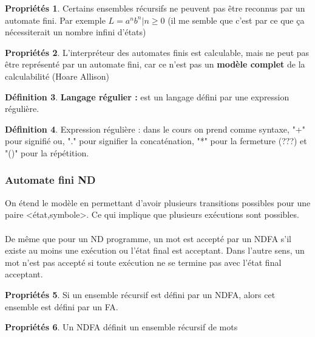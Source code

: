 \documentclass[11pt,a4paper]{article}
\theoremstyle{definition}
\newtheorem{mydef}{Définition}
\newtheorem{myprop}[mydef]{Propriétés}
\begin{document}
\begin{myprop}
	Certains ensembles récursifs ne peuvent pas être reconnus par un 
	automate fini. Par exemple $L = { a^n b^n | n\geq 0}$ (il me semble que 
	c'est par ce que ça nécessiterait un nombre infini d'états)
\end{myprop}

\begin{myprop}
	L'interpréteur des automates finis est calculable, mais ne peut pas être 
	représenté par un automate fini, car ce n'est pas un \textbf{modèle 
	complet} de la calculabilité (Hoare Allison)
\end{myprop}

\begin{mydef}
	\textbf{Langage régulier :} est un langage défini par une expression 
	régulière.
\end{mydef}

\begin{mydef}
	Expression régulière :  dans le cours on prend comme syntaxe, "+" pour 
	signifié ou, "." pour signifier la concaténation, "*" pour la 
	fermeture (???) et "()" pour la répétition.
\end{mydef}

\subsubsection{Automate fini ND}
\label{ssub:automate_fini_nd}
On étend le modèle en permettant d'avoir plusieurs transitions possibles pour 
une paire <état,symbole>. Ce qui implique que plusieurs exécutions sont 
possibles.

\paragraph{} De même que pour un ND programme, un mot est accepté par un NDFA 
s’il existe au moins une exécution ou l'état final est acceptant. Dans l'autre 
sens, un 
mot n'est pas accepté si toute exécution ne se termine pas avec l'état final 
acceptant.

\begin{myprop}
	Si un ensemble récursif est défini par un NDFA, alors cet ensemble est 
	défini par un FA.
\end{myprop}

\begin{myprop}
	Un NDFA définit un ensemble récursif de mots
\end{myprop}
\end{document}
